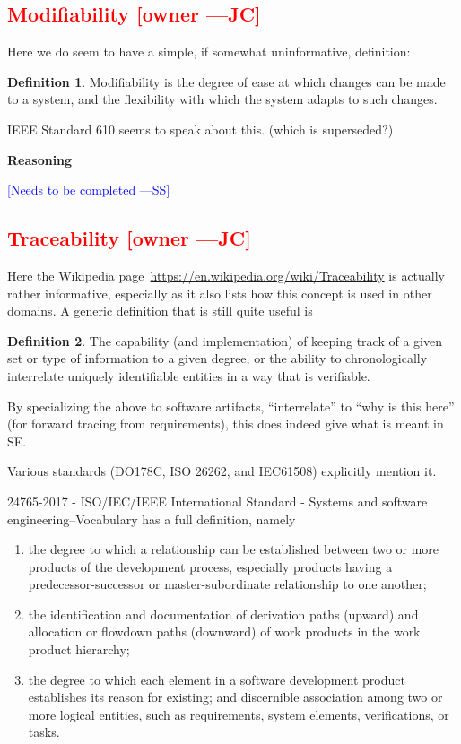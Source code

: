 \documentclass[letterpaper,cleveref]{lipics-v2019}
\newcommand{\authornote}[3]{\textcolor{#1}{[#3 ---#2]}}
\newcommand{\authornote}[3]{}
\newcommand{\wss}[1]{\authornote{blue}{SS}{#1}} %
\newcommand{\jc}[1]{\authornote{red}{JC}{#1}} %
\newcommand{\notdone}[1]{\textcolor{red}{#1}}
\theoremstyle{definition}
\newtheorem{defn}{Definition}
\begin{document}
\subsection{\notdone{Modifiability} \jc{owner}}

Here we do seem to have a simple, if somewhat uninformative, definition:

\begin{defn}
  Modifiability is the degree of ease at which changes can be made to a system,
  and the flexibility with which the system adapts to such changes.
\end{defn}

IEEE Standard 610 seems to speak about this. (which is superseded?)

\noindent \textbf{Reasoning}

\wss{Needs to be completed}

\subsection{\notdone{Traceability} \jc{owner}}

Here the Wikipedia page~\url{https://en.wikipedia.org/wiki/Traceability} is
actually rather informative, especially as it also lists how this concept is
used in other domains.  A generic definition that is still quite useful is
\begin{defn}
  The capability (and implementation) of keeping track of a given set or type of
  information to a given degree, or the ability to chronologically interrelate
  uniquely identifiable entities in a way that is verifiable.
\end{defn}
By specializing the above to software artifacts, ``interrelate'' to ``why is
this here'' (for forward tracing from requirements), this does indeed give what
is meant in SE.

Various standards (DO178C, ISO 26262, and IEC61508) explicitly mention it.

24765-2017 - ISO/IEC/IEEE International Standard - Systems and software
engineering--Vocabulary
has a full definition, namely
\begin{enumerate}
\item the degree to which a relationship can be established between two or more
  products of the development process, especially products having a
  predecessor-successor or master-subordinate relationship to one another;
\item the identification and documentation of derivation paths (upward) and
  allocation or flowdown paths (downward) of work products in the work product
  hierarchy;
\item the degree to which each element in a software development product
  establishes its reason for existing; and discernible association among two or
  more logical entities, such as requirements, system elements, verifications,
  or tasks.
\end{enumerate}
\end{document}
